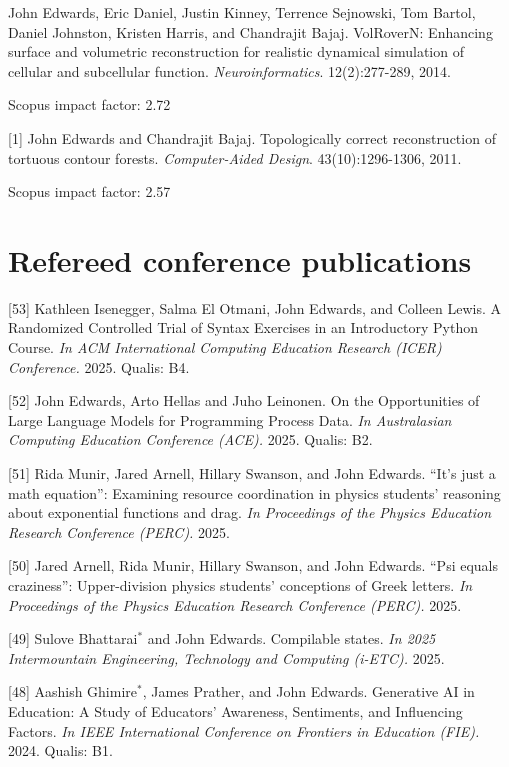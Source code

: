 \documentclass[margin,line]{res}
\newcommand{\pubunder}[1]{#1}
\newcommand{\jnum}[1]{[#1]}
\newcommand{\cnum}[1]{[#1]}
\begin{document}
\begin{resume}
\jnum{2} \pubunder{John Edwards}, Eric Daniel, Justin Kinney, Terrence Sejnowski, Tom Bartol, Daniel Johnston, Kristen Harris, and Chandrajit Bajaj. VolRoverN: Enhancing surface and volumetric reconstruction for realistic dynamical simulation of cellular and subcellular function.  \textit{Neuroinformatics}. 12(2):277-289, 2014.
\begin{IMPACT}
Scopus impact factor: 2.72 %
\end{IMPACT}

\jnum{1} \protect \pubunder{John Edwards} and Chandrajit Bajaj. Topologically correct reconstruction of tortuous contour forests. \textit{Computer-Aided Design}. 43(10):1296-1306, 2011.
\begin{IMPACT}
Scopus impact factor: 2.57 %
\end{IMPACT}


\section{\sc Refereed conference publications}
\cnum{53} Kathleen Isenegger, Salma El Otmani, John Edwards, and Colleen Lewis. A Randomized Controlled Trial of Syntax Exercises in an Introductory Python Course. \textit{In ACM International Computing Education Research (ICER) Conference.} 2025. Qualis: B4.

\cnum{52} John Edwards, Arto Hellas and Juho Leinonen. On the Opportunities of Large Language Models for Programming Process Data. \textit{In Australasian Computing Education Conference (ACE).} 2025. Qualis: B2.

\cnum{51} Rida Munir, Jared Arnell, Hillary Swanson, and John Edwards. ``It's just a math equation'': Examining resource coordination in physics students' reasoning about exponential functions and drag. \textit{In Proceedings of the Physics Education Research Conference (PERC).} 2025.

\cnum{50} Jared Arnell, Rida Munir, Hillary Swanson, and John Edwards. ``Psi equals craziness'': Upper-division physics students' conceptions of Greek letters. \textit{In Proceedings of the Physics Education Research Conference (PERC).} 2025.

\cnum{49} Sulove Bhattarai$^*$ and John Edwards. Compilable states. \textit{In 2025 Intermountain Engineering, Technology and Computing (i-ETC).} 2025.

\cnum{48} Aashish Ghimire$^*$, James Prather, and John Edwards. Generative AI in Education: A Study of Educators’ Awareness, Sentiments, and Influencing Factors. \textit{In IEEE International Conference on Frontiers in Education (FIE).} 2024. Qualis: B1.


\end{resume}
\end{document}
